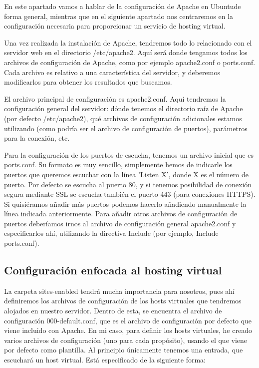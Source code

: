 \documentclass[a4paper, 10pt]{article} %
\begin{document}
En este apartado vamos a hablar de la configuración de Apache en Ubuntude forma general, mientras que en el siguiente apartado nos centraremos en la configuración necesaria para proporcionar un servicio de hosting virtual. 

Una vez realizada la instalación de Apache, tendremos todo lo relacionado con el servidor web en el directorio /etc/apache2. Aquí será donde tengamos todos los archivos de configuración de Apache, como por ejemplo apache2.conf o ports.conf. Cada archivo es relativo a una característica del servidor, y deberemos modificarlos para obtener los resultados que buscamos. 

El archivo principal de configuración es apache2.conf. Aquí tendremos la configuración general del servidor: dónde tenemos el directorio raíz de Apache (por defecto /etc/apache2), qué archivos de configuración adicionales estamos utilizando (como podría ser el archivo de configuración de puertos), parámetros para la conexión, etc. 

Para la configuración de los puertos de escucha, tenemos un archivo inicial que es ports.conf. Su formato es muy sencillo, simplemente hemos de indicarle los puertos que queremos escuchar con la línea 'Listen X', donde X es el número de puerto. Por defecto se escucha al puerto 80, y si tenemos posibilidad de conexión segura mediante SSL se escucha también el puerto 443 (para conexiones HTTPS). Si quisiéramos añadir más puertos podemos hacerlo añadiendo manualmente la línea indicada anteriormente. Para añadir otros archivos de configuración de puertos deberíamos irnos al archivo de configuración general apache2.conf y especificarlos ahí, utilizando la directiva Include (por ejemplo, Include ports.conf).

\subsection{Configuración enfocada al hosting virtual}

La carpeta sites-enabled tendrá mucha importancia para nosotros, pues ahí definiremos los archivos de configuración de los hosts virtuales que tendremos alojados en nuestro servidor. Dentro de esta, se encuentra el archivo de configuración 000-default.conf, que es el archivo de configuración por defecto que viene incluido con Apache. En mi caso, para definir los hosts virtuales, he creado varios archivos de configuración (uno para cada propósito), usando el que viene por defecto como plantilla. Al principio únicamente tenemos una entrada, que escuchará un host virtual. Está especificado de la siguiente forma: 
\end{document}
